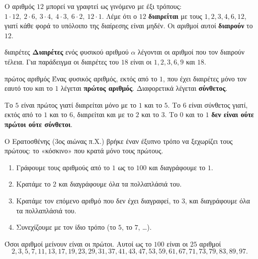 Ο αριθμός $12$ μπορεί να γραφτεί ως γινόμενο με έξι τρόπους: $1\cdot 12,\ 2\cdot 6,\ 3\cdot 4,\ 4\cdot 3,\ 6\cdot 2,\ 12\cdot 1$. Λέμε ότι ο $12$ \textbf{διαιρείται} με τους $1,2,3,4,6,12$, γιατί κάθε φορά το υπόλοιπο της διαίρεσης είναι μηδέν. Οι αριθμοί αυτοί \textbf{διαιρούν} το $12$.

\begin{orismos}{διαιρέτες}
\textbf{Διαιρέτες} ενός φυσικού αριθμού $\alpha$ λέγονται οι αριθμοί που τον διαιρούν τέλεια. Για παράδειγμα οι διαιρέτες του $18$ είναι οι $1,2,3,6,9$ και $18$.
\end{orismos}


\begin{orismos}{πρώτος αριθμός}
Ένας φυσικός αριθμός, εκτός από το $1$, που έχει διαιρέτες μόνο τον εαυτό του και το $1$ λέγεται \textbf{πρώτος αριθμός}. Διαφορετικά λέγεται \textbf{σύνθετος}.
\end{orismos}

Το $5$ είναι πρώτος γιατί διαιρείται μόνο με το $1$ και το $5$. Το $6$ είναι σύνθετος γιατί, εκτός από το $1$ και το $6$, διαιρείται και με το $2$ και το $3$. Το $0$ και το $1$ \textbf{δεν είναι ούτε πρώτοι ούτε σύνθετοι}.


Ο Ερατοσθένης (3ος αιώνας π.Χ.) βρήκε έναν έξυπνο τρόπο να ξεχωρίζει τους πρώτους: το «κόσκινο» που κρατά μόνο τους πρώτους.

\begin{enumerate}[leftmargin=1.6em,itemsep=0.2ex,topsep=2pt]
\item Γράφουμε τους αριθμούς από το $1$ ως το $100$ και διαγράφουμε το $1$.
\item Κρατάμε το $2$ και διαγράφουμε όλα τα πολλαπλάσιά του.
\item Κρατάμε τον επόμενο αριθμό που δεν έχει διαγραφεί, το $3$, και διαγράφουμε όλα τα πολλαπλάσιά του.
\item Συνεχίζουμε με τον ίδιο τρόπο (το $5$, το $7$, \dots).
\end{enumerate}

Όσοι αριθμοί μείνουν είναι οι πρώτοι. Αυτοί ως το $100$ είναι οι $25$ αριθμοί
$$2,3,5,7,11,13,17,19,23,29,31,37,41,43,47,53,59,61,67,71,73,79,83,89,97.$$

\begin{center}
\end{center}

